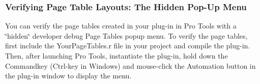 \hypertarget{a00833_verifying_page_table_layouts_the_hidden_popup_menu}{}\subsubsection{Verifying Page Table Layouts\+: The Hidden Pop-\/\+Up Menu}\label{a00833_verifying_page_table_layouts_the_hidden_popup_menu}
You can verify the page tables created in your plug-\/in in Pro Tools with a \char`\"{}hidden\char`\"{} developer debug Page Tables popup menu. To verify the page tables, first include the Your\+Page\+Tables.\+r file in your project and compile the plug-\/in. Then, after launching Pro Tools, instantiate the plug-\/in, hold down the Commandkey (Ctrl-\/key in Windows) and mouse-\/click the Automation button in the plug-\/in window to display the menu.


